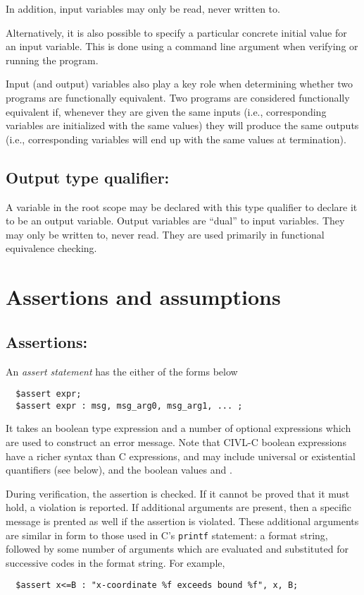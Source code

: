 In addition, input variables may only be read, never written to.

Alternatively, it is also possible to specify a particular concrete
initial value for an input variable.  This is done using a command
line argument when verifying or running the program.

Input (and output) variables also play a key role when determining
whether two programs are functionally equivalent.  Two programs are
considered functionally equivalent if, whenever they are given the
same inputs (i.e., corresponding \cinput{} variables are initialized
with the same values) they will produce the same outputs (i.e.,
corresponding \coutput{} variables will end up with the same values at
termination).

\subsection{Output type qualifier: \coutput}

A variable in the root scope may be declared with this type qualifier
to declare it to be an output variable.  Output variables are ``dual''
to input variables.  They may only be written to, never read.  They
are used primarily in functional equivalence checking.

\section{Assertions and assumptions}

\subsection{Assertions: \cassert}


An \emph{assert statement} has the either of the forms below
\begin{verbatim}
  $assert expr;
  $assert expr : msg, msg_arg0, msg_arg1, ... ;
\end{verbatim}

It takes an boolean type expression and a number of optional expressions which are used to construct an error message.
Note that CIVL-C boolean expressions have a richer syntax than C
expressions, and may include universal or existential quantifiers
(see below), and the boolean values  \ctrue{} and \cfalse{}.

During verification, the assertion is checked.  If it cannot be proved
that it must hold, a violation is reported. If additional arguments are present, then a specific message is prented as well if the assertion is violated.  These
additional arguments are similar in form to those used in C's
\texttt{printf} statement: a format string, followed by some number of
arguments which are evaluated and substituted for successive codes in
the format string.  For example,
\begin{verbatim}
  $assert x<=B : "x-coordinate %f exceeds bound %f", x, B; 
\end{verbatim}


